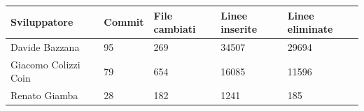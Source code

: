 \begin{table}[h!]
  \centering
  \begin{tabular}{ m{} | m{} | m{} | m{} | m{} }
    \textbf{Sviluppatore} & \textbf{Commit} & \textbf{File cambiati} & \textbf{Linee inserite} & \textbf{Linee eliminate} \\
    \hline
    Davide Bazzana        & 95              & 269                    & 34507                   & 29694                    \\
    \hline
    Giacomo Colizzi Coin  & 79              & 654                    & 16085                   & 11596                    \\
    \hline
    Renato Giamba         & 28              & 182                    & 1241                    & 185                      \\
    \hline
  \end{tabular}
\end{table}
